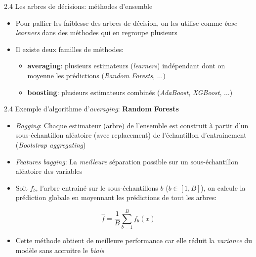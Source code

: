 \begin{frame}{2.4 Les arbres de décisions: méthodes d'ensemble}
  \begin{itemize}
  \item Pour pallier les faiblesse des arbres de décision, on les utilise comme \textit{base learners} dans des méthodes qui en regroupe plusieurs
  \item Il existe deux familles de méthodes:
    \begin{itemize}
      \normalsize
      \vspace{0.5cm}
    \item \textbf{averaging}: plusieurs estimateurs (\textit{learners}) indépendant dont on moyenne les prédictions (\textit{Random Forests}, $\dots$)
      \vspace{0.5cm}
    \item \textbf{boosting}: plusieurs estimateurs combinés (\textit{AdaBoost}, \textit{XGBoost}, $\dots$)
    \end{itemize}
  \end{itemize}
\end{frame}

\begin{frame}{2.4 Exemple d'algorithme d'\textit{averaging}: \textbf{Random Forests}}
  \begin{itemize}
  \item \textit{Bagging}: Chaque estimateur (arbre) de l'ensemble est construit à partir d'un sous-échantillon aléatoire (avec replacement) de l'échantillon d'entrainement (\textit{Bootstrap aggregating})
  \item \textit{Features bagging}: La \textit{meilleure} séparation possible sur un sous-échantillon aléatoire des variables
  \item Soit $f_{b}$, l'arbre entrainé sur le sous-échantillons $b$ ($b \in[1,B]$), on calcule la prédiction globale en moyennant les prédictions de tout les arbres:
  \end{itemize}
  \begin{equation*}
    \hat{f} = \frac{1}{B}\displaystyle\sum_{b=1}^{B} f_{b}(x)
  \end{equation*}
  \begin{itemize}
  \item Cette méthode obtient de meilleure performance car elle réduit la \textit{variance} du modèle sans accroitre le \textit{biais}
  \end{itemize}
\end{frame}

